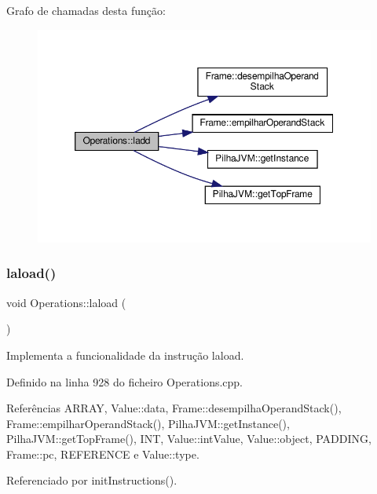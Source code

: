 Grafo de chamadas desta função\+:\nopagebreak
\begin{figure}[H]
\begin{center}
\leavevmode
\includegraphics[width=350pt]{classOperations_ad4b153d687baa98c26fcfe7c24e12f45_cgraph}
\end{center}
\end{figure}
\mbox{\label{classOperations_a064f10825e8f0153ef19d466845d3734}} 
\subsubsection{\texorpdfstring{laload()}{laload()}}
{\footnotesize\ttfamily void Operations\+::laload (\begin{DoxyParamCaption}{ }\end{DoxyParamCaption})\hspace{0.3cm}{\ttfamily [private]}}



Implementa a funcionalidade da instrução laload. 



Definido na linha 928 do ficheiro Operations.\+cpp.



Referências A\+R\+R\+AY, Value\+::data, Frame\+::desempilha\+Operand\+Stack(), Frame\+::empilhar\+Operand\+Stack(), Pilha\+J\+V\+M\+::get\+Instance(), Pilha\+J\+V\+M\+::get\+Top\+Frame(), I\+NT, Value\+::int\+Value, Value\+::object, P\+A\+D\+D\+I\+NG, Frame\+::pc, R\+E\+F\+E\+R\+E\+N\+CE e Value\+::type.



Referenciado por init\+Instructions().

